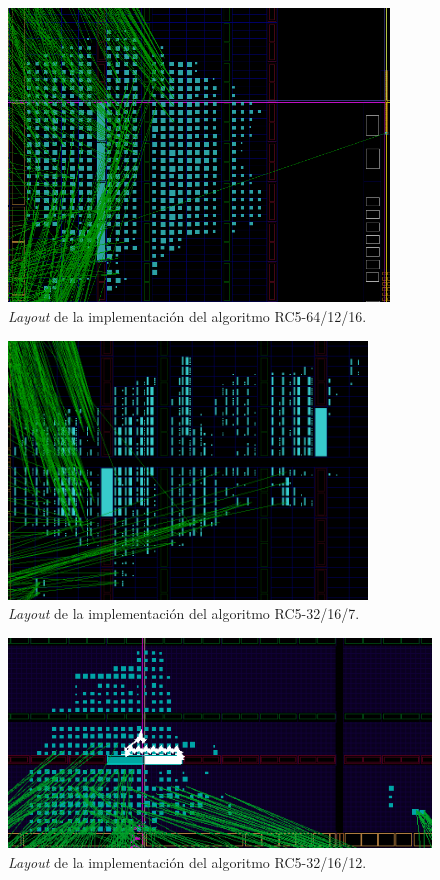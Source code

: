 \begin{figure}
	\includegraphics[width=0.9\textwidth]{./images/fig64_12_16_layout}
	\caption{\textit{Layout} de la implementación del algoritmo RC5-64/12/16.}
	\label{fig64_12_16_layout}
\end{figure}
\begin{figure}[H]
	\centering
	\includegraphics[width=0.85\textwidth]{./images/fig32_16_7_layout}
	\caption{\textit{Layout} de la implementación del algoritmo RC5-32/16/7.}
	\label{fig32_16_7_layout}
\end{figure}

\begin{figure}
	\includegraphics[width=1\textwidth]{./images/fig32_16_12_layout}
	\caption{\textit{Layout} de la implementación del algoritmo RC5-32/16/12.}
	\label{fig32_16_12_layout}
\end{figure}


